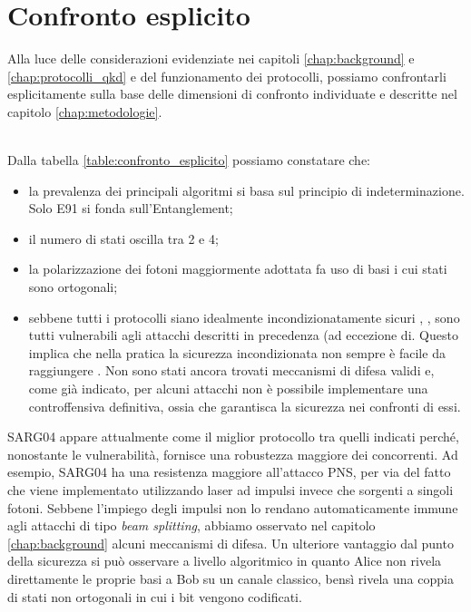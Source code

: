 \chapter{Confronto esplicito}
\label{chap:confronto_esplicito}

Alla luce delle considerazioni evidenziate nei capitoli \ref{chap:background} e \ref{chap:protocolli_qkd} e del funzionamento dei protocolli, possiamo confrontarli esplicitamente sulla base delle dimensioni di confronto individuate e descritte nel capitolo \ref{chap:metodologie}.

\\ Dalla tabella \ref{table:confronto_esplicito} possiamo constatare che:
\begin{itemize}
    \item la prevalenza dei principali algoritmi si basa sul principio di indeterminazione. Solo E91 si fonda sull'Entanglement;
    \item il numero di stati oscilla tra 2 e 4;
    \item la polarizzazione dei fotoni maggiormente adottata fa uso di basi i cui stati sono ortogonali;
    \item sebbene tutti i protocolli siano idealmente incondizionatamente sicuri \cite{mayers}, \cite{tamaki} \cite{lo_chau}, sono tutti vulnerabili agli attacchi descritti in precedenza (ad eccezione di. Questo implica che nella pratica la sicurezza incondizionata non sempre è facile da raggiungere \cite{brassard_lutknenhaus}. Non sono stati ancora trovati meccanismi di difesa validi e, come già indicato, per alcuni attacchi non è possibile implementare una controffensiva definitiva, ossia che garantisca la sicurezza nei confronti di essi.  
\end{itemize}

SARG04 appare attualmente come il miglior protocollo tra quelli indicati perché, nonostante le vulnerabilità, fornisce una robustezza maggiore dei concorrenti. Ad esempio, SARG04 ha una resistenza maggiore all'attacco PNS, per via del fatto che viene implementato utilizzando laser ad impulsi invece che sorgenti a singoli fotoni. Sebbene l'impiego degli impulsi non lo rendano automaticamente immune agli attacchi di tipo \textit{beam splitting}, abbiamo osservato nel capitolo \ref{chap:background} alcuni meccanismi di difesa. Un ulteriore vantaggio dal punto della sicurezza si può osservare a livello algoritmico in quanto Alice non rivela direttamente le proprie basi a Bob su un canale classico, bensì rivela una coppia di stati non ortogonali in cui i bit vengono codificati. 

